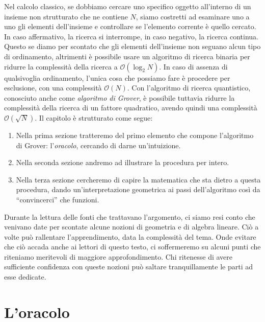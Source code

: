 \documentclass{book}
\theoremstyle{definition}
\theoremstyle{definition}
\theoremstyle{definition}
\theoremstyle{plain}
\theoremstyle{plain}
\theoremstyle{plain}
\theoremstyle{plain}
\begin{document}
Nel calcolo classico, se dobbiamo cercare uno specifico oggetto all'interno di un insieme non strutturato che ne contiene $N$, siamo costretti ad esaminare uno a uno gli elementi dell'insieme e controllare se l'elemento corrente è quello cercato. In caso affermativo, la ricerca si interrompe, in caso negativo, la ricerca continua. Questo se diamo per scontato che gli elementi dell'insieme non seguano alcun tipo di ordinamento, altrimenti è possibile usare un algoritmo di ricerca binaria per ridurre la complessità della ricerca a $\mathcal{O}(\log_2 N)$. In caso di assenza di qualsivoglia ordinamento, l'unica cosa che possiamo fare è procedere per esclusione, con una complessità $\mathcal{O}(N)$. Con l'algoritmo di ricerca quantistico, conosciuto anche come \emph{algoritmo di Grover}, è possibile tuttavia ridurre la complessità della ricerca di un fattore quadratico, avendo quindi una complessità $\mathcal{O}(\sqrt{N})$.
Il capitolo è strutturato come segue:
\begin{enumerate}
    \item Nella prima sezione tratteremo del primo elemento che compone l'algoritmo di Grover: l'\emph{oracolo}, cercando di darne un'intuizione.
    \item Nella seconda sezione andremo ad illustrare la procedura per intero.
    \item Nella terza sezione cercheremo di capire la matematica che sta dietro a questa procedura, dando un'interpretazione geometrica ai passi dell'algoritmo così da ``convincerci'' che funzioni.
\end{enumerate}
Durante la lettura delle fonti che trattavano l'argomento, ci siamo resi conto che venivano date per scontate alcune nozioni di geometria e di algebra lineare. Ciò a volte può rallentare l'apprendimento, data la complessità del tema. Onde evitare che ciò accada anche ai lettori di questo testo, ci soffermeremo su alcuni punti che riteniamo meritevoli di maggiore approfondimento. Chi ritenesse di avere sufficiente confidenza con queste nozioni può saltare tranquillamente le parti ad esse dedicate.
\section{L'oracolo}
\end{document}
